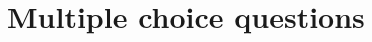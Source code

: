 \section{Multiple choice questions}

\begin{questions}
    
    
    
    
    
    
\end{questions}